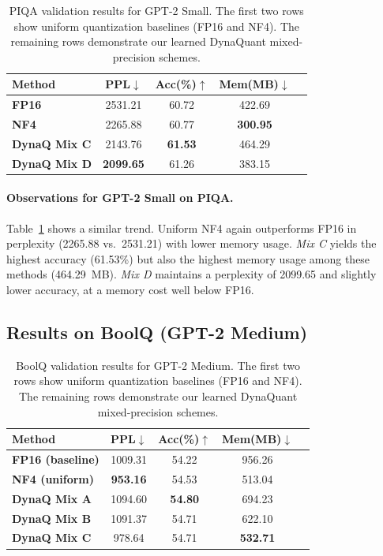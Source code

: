 \documentclass{article}
\begin{document}
	\begin{table}[ht]
		\centering
		\label{tab:piqa-small}
		\begin{tabular}{lcccc}
			\toprule
			\textbf{Method} & \textbf{PPL}$\downarrow$ & \textbf{Acc(\%)}$\uparrow$ & \textbf{Mem(MB)}$\downarrow$ \\
			\midrule
			\textbf{FP16}    & 2531.21 & 60.72 & 422.69 \\
			\textbf{NF4}     & 2265.88 & 60.77 & \textbf{300.95} \\
			\midrule
			\textbf{DynaQ Mix C} & 2143.76 & \textbf{61.53} & 464.29 \\
			\textbf{DynaQ Mix D} & \textbf{2099.65} & 61.26 & 383.15 \\
			\bottomrule
		\end{tabular}
		\caption{\small PIQA validation results for GPT-2 Small. The first two rows show uniform quantization baselines (FP16 and NF4). The remaining rows demonstrate our learned DynaQuant mixed-precision schemes.}
	\end{table}
	
	\paragraph{Observations for GPT-2 Small on PIQA.}
	Table~\ref{tab:piqa-small} shows a similar trend. Uniform NF4 again outperforms FP16 in perplexity (2265.88 vs.\ 2531.21) with lower memory usage. \emph{Mix C} yields the highest accuracy (61.53\%) but also the highest memory usage among these methods (464.29~MB). \emph{Mix D} maintains a perplexity of 2099.65 and slightly lower accuracy, at a memory cost well below FP16.
	
	\subsection{Results on BoolQ (GPT-2 Medium)}
	
	\begin{table}[ht]
		\centering
		\label{tab:boolq-medium}
		\begin{tabular}{lcccc}
			\toprule
			\textbf{Method} & \textbf{PPL}$\downarrow$ & \textbf{Acc(\%)}$\uparrow$ & \textbf{Mem(MB)}$\downarrow$ \\
			\midrule
			\textbf{FP16 (baseline)}  & 1009.31 & 54.22 & 956.26 \\
			\textbf{NF4 (uniform)}    & \textbf{953.16}  & 54.53 & 513.04 \\
			\midrule
			\textbf{DynaQ Mix A}      & 1094.60 & \textbf{54.80} & 694.23 \\
			\textbf{DynaQ Mix B}      & 1091.37 & 54.71 & 622.10 \\
			\textbf{DynaQ Mix C}      & 978.64  & 54.71 & \textbf{532.71} \\
			\bottomrule
		\end{tabular}
		\caption{\small BoolQ validation results for GPT-2 Medium. The first two rows show uniform quantization baselines (FP16 and NF4). The remaining rows demonstrate our learned DynaQuant mixed-precision schemes.}
	\end{table}
	
\end{document}
